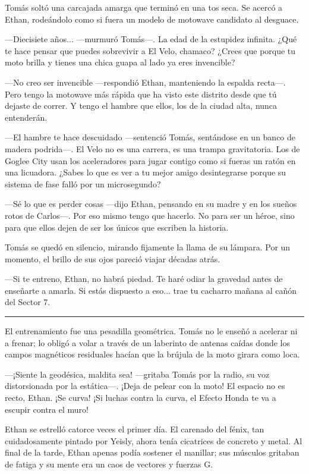 \documentclass[12pt,a4paper]{book}
\begin{document}
Tomás soltó una carcajada amarga que terminó en una tos seca. Se acercó a Ethan, rodeándolo como si fuera un modelo de motowave candidato al desguace.

---Diecisiete años... ---murmuró Tomás---. La edad de la estupidez infinita. ¿Qué te hace pensar que puedes sobrevivir a El Velo, chamaco? ¿Crees que porque tu moto brilla y tienes una chica guapa al lado ya eres invencible?

---No creo ser invencible ---respondió Ethan, manteniendo la espalda recta---. Pero tengo la motowave más rápida que ha visto este distrito desde que tú dejaste de correr. Y tengo el hambre que ellos, los de la ciudad alta, nunca entenderán.

---El hambre te hace descuidado ---sentenció Tomás, sentándose en un banco de madera podrida---. El Velo no es una carrera, es una trampa gravitatoria. Los de Goglee City usan los aceleradores para jugar contigo como si fueras un ratón en una licuadora. ¿Sabes lo que es ver a tu mejor amigo desintegrarse porque su sistema de fase falló por un microsegundo?

---Sé lo que es perder cosas ---dijo Ethan, pensando en su madre y en los sueños rotos de Carlos---. Por eso mismo tengo que hacerlo. No para ser un héroe, sino para que ellos dejen de ser los únicos que escriben la historia.

Tomás se quedó en silencio, mirando fijamente la llama de su lámpara. Por un momento, el brillo de sus ojos pareció viajar décadas atrás.

---Si te entreno, Ethan, no habrá piedad. Te haré odiar la gravedad antes de enseñarte a amarla. Si estás dispuesto a eso... trae tu cacharro mañana al cañón del Sector 7.

\bigskip
\noindent\rule{\textwidth}{0.4pt}
\bigskip

El entrenamiento fue una pesadilla geométrica. Tomás no le enseñó a acelerar ni a frenar; lo obligó a volar a través de un laberinto de antenas caídas donde los campos magnéticos residuales hacían que la brújula de la moto girara como loca.

---¡Siente la geodésica, maldita sea! ---gritaba Tomás por la radio, su voz distorsionada por la estática---. ¡Deja de pelear con la moto! El espacio no es recto, Ethan. ¡Se curva! ¡Si luchas contra la curva, el Efecto Honda te va a escupir contra el muro!

Ethan se estrelló catorce veces el primer día. El carenado del fénix, tan cuidadosamente pintado por Yeisly, ahora tenía cicatrices de concreto y metal. Al final de la tarde, Ethan apenas podía sostener el manillar; sus músculos gritaban de fatiga y su mente era un caos de vectores y fuerzas G.
\end{document}
